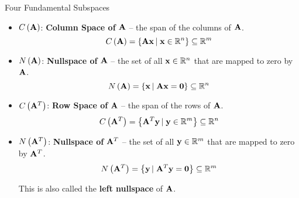 \documentclass[aspectratio=169]{beamer}
\def\mf{\ensuremath\mathbf}
\begin{document}
\begin{frame}[t]{Four Fundamental Subspaces}
\begin{itemize}
    \item $C\left(\mf{A}\right)$: \textbf{Column Space of} $\mf{A}$ -- the span of the columns of $\mf{A}$.
    \[ C\left(\mf{A}\right) = \left\{\mf{Ax} \left|\right. \mf{x} \in \mathbb{R}^n\right\} \subseteq \mathbb{R}^m \]

    \item $N\left(\mf{A}\right)$: \textbf{Nullspace of} $\mf{A}$ -- the set of all $\mf{x} \in \mathbb{R}^n$ that are mapped to zero by $\mf{A}$.
    \[ N\left(\mf{A}\right) = \left\{\mf{x} \left|\right. \mf{Ax}  = \mf{0}\right\} \subseteq \mathbb{R}^n \]
    
    \item $C\left(\mf{A}^T\right)$: \textbf{Row Space of} $\mf{A}$ -- the span of the rows of $\mf{A}$.
    \[ C\left(\mf{A}^T\right) = \left\{\mf{A}^T\mf{y} \left|\right. \mf{y} \in \mathbb{R}^m\right\} \subseteq \mathbb{R}^n \]

    \item $N\left(\mf{A}^T\right)$: \textbf{Nullspace of} $\mf{A}^T$ -- the set of all $\mf{y} \in \mathbb{R}^m$ that are mapped to zero by $\mf{A}^T$.
    \[ N\left(\mf{A}^T\right) = \left\{\mf{y} \left|\right. \mf{A}^T\mf{y}  = \mf{0}\right\} \subseteq \mathbb{R}^m \]

    This is also called the \textbf{left nullspace} of $\mf{A}$.
\end{itemize}
\end{frame}
\end{document}
